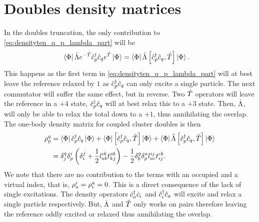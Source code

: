     \section{Doubles density matrices}
        \label{app:ccd-density-matrices}
        In the doubles truncation, the only contribution to
        \autoref{eq:densityten_q_p_lambda_part} will be
        \begin{align}
            \bra{\Phi}\hat{\Lambda} e^{-\hat{T}}\hat{c}_{p}^{\dagger}\hat{c}_{q}e^{\hat{T}}\ket{\Phi}
            &= \bra{\Phi}\hat{\Lambda} \left[\hat{c}_{p}^{\dagger}\hat{c}_{q}, \hat{T}\right]\ket{\Phi}.
        \end{align}
        This happens as the first term in \autoref{eq:densityten_q_p_lambda_part} will
        at best leave the reference relaxed by $1$ as $\hat{c}_{p}^{\dagger}\hat{c}_{q}$ can only
        excite a single particle. The next commutator will suffer the same
        effect, but in reverse. Two $\hat{T}$ operators will leave the reference in a
        $+4$ state, $\hat{c}_{p}^{\dagger}\hat{c}_{q}$ will at best relax this to a $+3$ state.
        Then, $\hat{\Lambda}$, will only be able to relax the total down to a $+1$,
        thus annihilating the overlap. The one-body density matrix for coupled
        cluster doubles is then
        \begin{align}
            \rho^{q}_{p}
            &= \bra{\Phi}\hat{c}_{p}^{\dagger}\hat{c}_{q}\ket{\Phi}
            + \bra{\Phi}\left[\hat{c}_{p}^{\dagger}\hat{c}_{q}, \hat{T}\right]\ket{\Phi}
            + \bra{\Phi}\hat{\Lambda} \left[\hat{c}_{p}^{\dagger}\hat{c}_{q}, \hat{T}\right]\ket{\Phi}
            \\
            &=
            \delta^{q}_{j} \delta^{i}_{p} \left( 
                \delta^{j}_{i}
                + \frac{1}{2} l^{ik}_{ab} t^{ab}_{kj}
             \right)
            - \frac{1}{2} \delta^{q}_{b} \delta^{a}_{p} l^{ij}_{ac} t^{cb}_{ij}.
        \end{align}
        We note that there are no contribution to the terms with an occupied and
        a virtual index, that is, $\rho^{i}_{a} = \rho^{a}_{i} = 0$. This is a
        direct consequence of the lack of single excitations. The density
        operators $\hat{c}_{a}^{\dagger}\hat{c}_{i}$ and $\hat{c}_{i}^{\dagger}\hat{c}_{a}$ will excite and relax a
        single particle respectively. But, $\hat{\Lambda}$ and $\hat{T}$ only works on pairs
        therefore leaving the reference oddly excited or relaxed thus
        annihilating the overlap.

